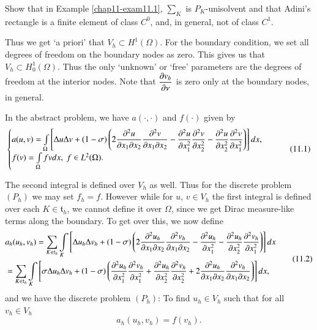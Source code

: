 \begin{exercise}\label{chap11-exer11.1}
Show that in Example \ref{chap11-exam11.1}, $\sum_{K}$ is
$P_{K}$-unisolvent and that Adini's rectangle is a finite element of
class $C^{0}$, and, in general, not of class $C^{1}$.
\end{exercise}

Thus we get `a priori' that $V_{h}\subset H^{1}(\Omega)$. For the
boundary condition, we set all degrees of freedom on the boundary
nodes as zero. This gives us that $V_{h}\subset
H^{1}_{0}(\Omega)$. Thus the only `unknown' or `free' parameters are
the degrees of freedom at the interior nodes. Note that $\dfrac{\partial
  v_{h}}{\partial \nu}$ is zero only at the boundary nodes, in general.

In the abstract problem, we have $a(\cdot,\cdot)$ and $f(\cdot)$ given
by
{\fontsize{10}{12}\selectfont
\begin{equation*}
\begin{cases}
a(u,v)=\int\limits_{\Omega}\left[\Delta u\Delta
  v+(1-\sigma)\left(2\dfrac{\partial^{2}u}{\partial x_{1}\partial x_{2}}\dfrac{\partial^{2}v}{\partial
    x_{1}\partial x_{2}}-\dfrac{\partial^{2}u}{\partial x^{2}_{1}}\dfrac{\partial^{2}v}{\partial
    x^{2}_{2}}-\dfrac{\partial^{2}u}{\partial x^{2}_{2}}\dfrac{\partial^{2}v}{\partial
    x^{2}_{1}}\right)\right]dx,\\ 
f(v)=\int\limits_{\Omega}fvdx,\ f\in L^{2}(\Omega).
\end{cases}\tag{11.1}\label{chap11-eq11.1}
\end{equation*}}

The second integral is defined over $V_{h}$ as well. Thus for the
discrete problem $(P_{h})$ we may set $f_{h}=f$. However while for
$u$, $v\in V_{h}$ the first integral is defined over each
$K\in\mathfrak{t}_{h}$, we cannot define it over $\Omega$, since we
get Dirac measure-like terms along the boundary. To get over this, we
now define
{\fontsize{9}{11}\selectfont
\begin{equation*}
\begin{split}
& a_{h}(u_{h},v_{h})=\sum\limits_{K\in\mathfrak{t}_{h}}\int\limits_{K}\left[\Delta
  u_{h}\Delta v_{h}+(1-\sigma)\left(2\frac{\partial^{2}u_{h}}{\partial x_{1}\partial
    x_{2}}\frac{\partial^{2}v_{h}}{\partial x_{1}\partial x_{2}}-\frac{\partial^{2}u_{h}}{\partial
    x^{2}_{1}}-\frac{\partial^{2}u_{h}}{\partial x^{2}_{2}}\frac{\partial^{2}v_{h}}{\partial
    x^{2}_{1}}\right)\right]dx\\ 
& =\sum\limits_{K\in\mathfrak{t}_{h}}\int\limits_{K}\left[\sigma\Delta
    u_{h}\Delta v_{h}+(1-\sigma)\left(\frac{\partial^{2}u_{h}}{\partial
      x^{2}_{1}}\frac{\partial^{2}v_{h}}{\partial x^{2}_{1}}+\frac{\partial^{2}u_{h}}{\partial
      x^{2}_{2}}\frac{\partial^{2}v_{h}}{\partial
      x^{2}_{2}}+2\frac{\partial^{2}u_{h}}{\partial x_{1}\partial
      x_{2}}\frac{\partial^{2}v_{h}}{\partial x_{1}\partial x_{2}}\right)\right]dx,
\end{split}\tag{11.2}\label{chap11-eq11.2}
\end{equation*}}
and we have the discrete problem $(P_{h})$: To find $u_{h}\in V_{h}$
such that for all $v_{h}\in V_{h}$ 
\begin{equation*}
a_{h}(u_{h},v_{h})=f(v_{h}).\tag{11.3}\label{chap11-eq11.3}
\end{equation*}\pageoriginale

